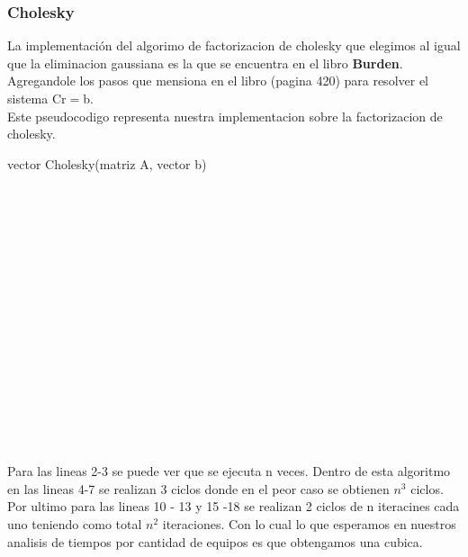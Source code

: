 \newpage
\subsubsection{Cholesky}

La implementación del algorimo de factorizacion de cholesky que elegimos al igual que la eliminacion gaussiana es la que se encuentra en el libro \textbf{Burden}.
Agregandole los pasos que mensiona en el libro (pagina 420) para resolver el sistema Cr$=$b.\\

Este pseudocodigo representa nuestra implementacion sobre la factorizacion de cholesky.

\begin{algorithm}
    \begin{algorithmic}[1]\parskip=2mm
        \caption{vector Cholesky(matriz A, vector b)}
        \\
        \\
        \\
        \\
        \\
        \\
        \\
        \\
        \\
        \\
        \\
        \\
        \\
        \\
        \\
    \end{algorithmic}
\end{algorithm}
Para las lineas 2-3 se puede ver que se ejecuta n veces.
Dentro de esta algoritmo en las lineas 4-7 se realizan 3 ciclos donde en el peor caso se obtienen $n^3 $ ciclos.
Por ultimo para las lineas 10 - 13 y 15 -18 se realizan 2 ciclos de n iteracines cada uno teniendo como total $n^2$ iteraciones.
Con lo cual lo que esperamos en nuestros analisis de tiempos por cantidad de equipos es que obtengamos una cubica.

